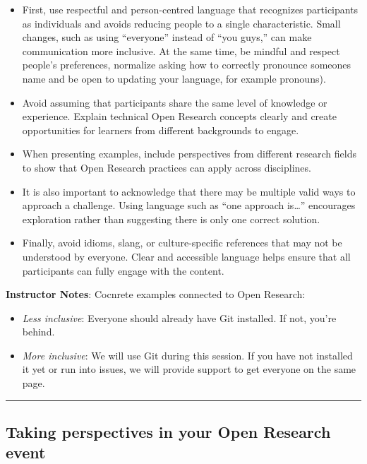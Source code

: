 \documentclass[
  letterpaper,
  DIV=11,
  numbers=noendperiod]{scrartcl}
\begin{document}
\begin{itemize}
\item
  First, use respectful and person-centred language that recognizes
  participants as individuals and avoids reducing people to a single
  characteristic. Small changes, such as using ``everyone'' instead of
  ``you guys,'' can make communication more inclusive. At the same time,
  be mindful and respect people's preferences, normalize asking how to
  correctly pronounce someones name and be open to updating your
  language, for example pronouns).
\item
  Avoid assuming that participants share the same level of knowledge or
  experience. Explain technical Open Research concepts clearly and
  create opportunities for learners from different backgrounds to
  engage.
\item
  When presenting examples, include perspectives from different research
  fields to show that Open Research practices can apply across
  disciplines.
\item
  It is also important to acknowledge that there may be multiple valid
  ways to approach a challenge. Using language such as ``one approach
  is\ldots'' encourages exploration rather than suggesting there is only
  one correct solution.
\item
  Finally, avoid idioms, slang, or culture-specific references that may
  not be understood by everyone. Clear and accessible language helps
  ensure that all participants can fully engage with the content.
\end{itemize}

\textbf{Instructor Notes}: Cocnrete examples connected to Open Research:

\begin{itemize}
\item
  \emph{Less inclusive}: Everyone should already have Git installed. If
  not, you're behind.
\item
  \emph{More inclusive}: We will use Git during this session. If you
  have not installed it yet or run into issues, we will provide support
  to get everyone on the same page.
\end{itemize}

\begin{center}\rule{0.5\linewidth}{0.5pt}\end{center}

\subsection{Taking perspectives in your Open Research
event}\label{taking-perspectives-in-your-open-research-event}
\end{document}
